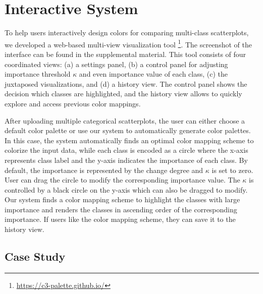 \section{Interactive System}



\label{sec:interaction}
To help users interactively design colors for comparing multi-class scatterplots, we developed a web-based multi-view visualization tool \footnote{\small \url{https://c3-palette.github.io/}}.
The screenshot of the interface can be found in the supplemental material.
This tool consists of four coordinated views: (a) a settings panel, (b) a control panel for adjusting importance threshold $\kappa$ and even importance value of each class, (c) the juxtaposed visualizations, and (d) a history view. The control panel shows the decision which classes are highlighted, and the history view allows to quickly explore and access previous color mappings.

After uploading multiple categorical scatterplots, the user can either choose a default color palette or use our system to automatically generate color palettes. In this case, the system automatically finds an optimal color mapping scheme to colorize the input data, while each class is encoded as a circle where the x-axis represents class label and the y-axis indicates the importance of each class. By default, the importance is represented by the change degree and $\kappa$ is set to zero. User can drag the circle to modify the corresponding importance value. The $\kappa$ is controlled by a black circle on the y-axis which can also be dragged to modify. Our system finds a color mapping scheme to highlight the classes with large importance and renders the classes in ascending order of the corresponding importance. If users like the color mapping scheme, they can save it to the history view.




\subsection{Case Study}
\label{sec:caseStudy}


